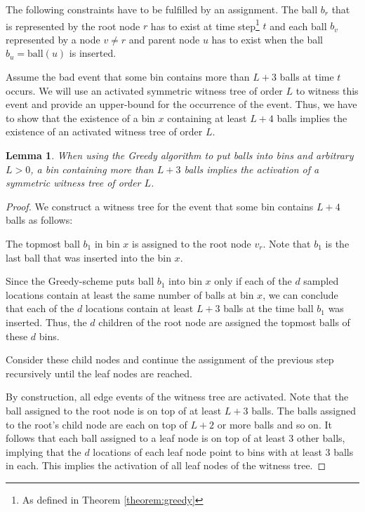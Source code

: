 \documentclass[a4paper,12pt]{article}
\newtheorem{lemma}{Lemma}
\begin{document}
The following constraints have to be fulfilled by an assignment. The ball $b_r$ that is represented by the root node $r$ has to exist at time step\footnote{As defined in Theorem \ref{theorem:greedy}} $t$ and each ball $b_v$ represented by a node $v \neq r$ and parent node $u$ has to exist when the ball $b_u = \mathrm{ball}(u)$ is inserted.

Assume the bad event that some bin contains more than $L+3$ balls at time $t$ occurs. We will use an activated symmetric witness tree of order $L$ to witness this event and provide an upper-bound for the occurrence of the event. Thus, we have to show that the existence of a bin $x$ containing at least $L+4$ balls implies the existence of an activated witness tree of order $L$. 

\begin{lemma}
When using the Greedy algorithm to put balls into bins and arbitrary $L > 0$, a bin containing more than $L+3$ balls implies the activation of a symmetric witness tree of order $L$.
\end{lemma}

\begin{proof}
We construct a witness tree for the event that some bin contains $L+4$ balls as follows:
\begin{compactenum}
\item The topmost ball $b_1$ in bin $x$ is assigned to the root node $v_r$. Note that $b_1$ is the last ball that was inserted into the bin $x$.
\item Since the Greedy-scheme puts ball $b_1$ into bin $x$ only if each of the $d$ sampled locations contain at least the same number of balls at bin $x$, we can conclude that each of the $d$ locations contain at least $L+3$ balls at the time ball $b_1$ was inserted. Thus, the $d$ children of the root node are assigned the topmost balls of these $d$ bins.
\item Consider these child nodes and continue the assignment of the previous step recursively until the leaf nodes are reached.  
\end{compactenum}

By construction, all edge events of the witness tree are activated. Note that the ball assigned to the root node is on top of at least $L+3$ balls. The balls assigned to the root's child node are each on top of $L+2$ or more balls and so on. It follows that each ball assigned to a leaf node is on top of at least 3 other balls, implying that the $d$ locations of each leaf node point to bins with at least 3 balls in each. This implies the activation of all leaf nodes of the witness tree.
\end{proof}
\end{document}
